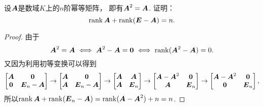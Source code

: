 \begin{example}\label{example:幂等矩阵.幂等矩阵的秩的性质1}
设\(\boldsymbol{A}\)是数域\(K\)上的\(n\)阶幂等矩阵，
即有\(\boldsymbol{A}^2=\boldsymbol{A}\).
证明：\begin{equation*}
	\rank\boldsymbol{A} + \rank(\boldsymbol{E} - \boldsymbol{A}) = n.
\end{equation*}
\begin{proof}
由于\begin{equation*}
	\boldsymbol{A}^2=\boldsymbol{A}
	\iff
	\boldsymbol{A}^2-\boldsymbol{A}=\boldsymbol0
	\iff
	\rank(\boldsymbol{A}^2-\boldsymbol{A})=0.
\end{equation*}
又因为利用初等变换可以得到\begin{equation*}
	\begin{bmatrix}
		\boldsymbol{A} & \boldsymbol0 \\
		\boldsymbol0 & \boldsymbol{E}_n-\boldsymbol{A}
	\end{bmatrix}
	\to \begin{bmatrix}
		\boldsymbol{A} & \boldsymbol0 \\
		\boldsymbol{A} & \boldsymbol{E}_n-\boldsymbol{A}
	\end{bmatrix}
	\to \begin{bmatrix}
		\boldsymbol{A} & \boldsymbol{A} \\
		\boldsymbol{A} & \boldsymbol{E}_n
	\end{bmatrix}
	\to \begin{bmatrix}
		\boldsymbol{A}-\boldsymbol{A}^2 & \boldsymbol0 \\
		\boldsymbol{A} & \boldsymbol{E}_n
	\end{bmatrix}
	\to \begin{bmatrix}
		\boldsymbol{A}-\boldsymbol{A}^2 & \boldsymbol0 \\
		\boldsymbol0 & \boldsymbol{E}_n
	\end{bmatrix},
\end{equation*}
所以\(\rank\boldsymbol{A}+\rank(\boldsymbol{E}_n-\boldsymbol{A})
=\rank(\boldsymbol{A}-\boldsymbol{A}^2)+n
=n\).
\end{proof}
\end{example}

